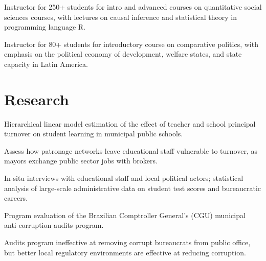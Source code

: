 \documentclass[]{deedy-resume-openfont}
\begin{document}
\begin{minipage}[t]{0.66\textwidth}
\begin{tightemize}
\item Instructor for 250+ students for intro and advanced courses on quantitative social sciences courses, with lectures on causal inference and statistical theory in programming language R.
\item Instructor for 80+ students for introductory course on comparative politics, with emphasis on the political economy of development, welfare states, and state capacity in Latin America.
\end{tightemize}
\sectionsep


\section{Research}
\begin{tightemize}
\item Hierarchical linear model estimation of the effect of teacher and school principal turnover on student learning in municipal public schools.
\item Assess how patronage networks leave educational staff vulnerable to turnover, as mayors exchange public sector jobs with brokers.
\item In-situ interviews with educational staff and local political actors; statistical analysis of large-scale administrative data on student test scores and bureaucratic careers. 
\end{tightemize}
\sectionsep

\begin{tightemize}
\item Program evaluation of the Brazilian Comptroller General's (CGU) municipal anti-corruption audits program.
\item Audits program ineffective at removing corrupt bureaucrats from public office, but better local regulatory environments are effective at reducing corruption.
\end{tightemize}
\sectionsep

\end{minipage} 
\end{document}
